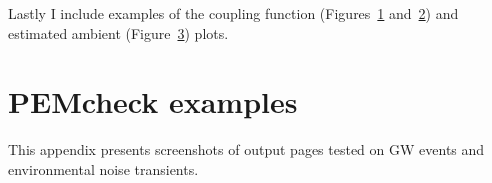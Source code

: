 Lastly I include examples of the coupling function (Figures~\ref{fig:pemcoupling-sitewide-physical} and~\ref{fig:pemcoupling-sitewide-raw}) and estimated ambient (Figure~\ref{fig:pemcoupling-sitewide-ambient}) plots.

\begin{figure}
  \centering
  \caption{}
  \label{fig:pemcoupling-sitewide-physical}
\end{figure}

\begin{figure}
  \centering
  \caption{}
  \label{fig:pemcoupling-sitewide-raw}
\end{figure}

\begin{figure}
  \centering
  \caption{}
  \label{fig:pemcoupling-sitewide-ambient}
\end{figure}


\setcounter{figure}{0}
\setcounter{table}{0}

\chapter{PEMcheck examples}\label{app:pemcheck}

This appendix presents screenshots of  output pages tested on GW events and environmental noise transients.

\begin{figure}
  \centering
  \caption{}
  \label{fig:pemcheck-GW190510g}
\end{figure}
